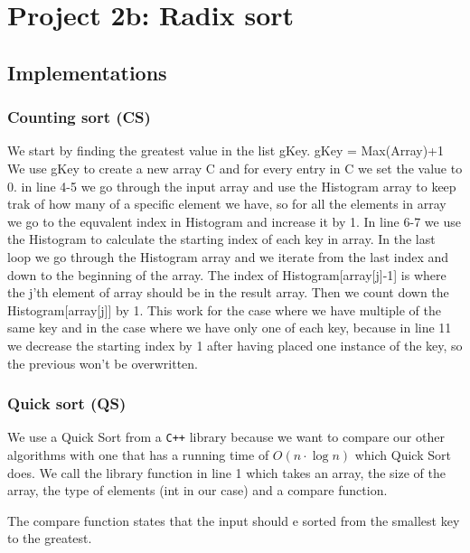 
\chapter{Project 2b: Radix sort} %

\label{Chapter3} %




\section{Implementations}




\subsection{Counting sort (CS)}
We start by finding the greatest value in the list gKey.
gKey = Max(Array)+1
We use gKey to create a new array C and for every entry in C we set the value to 0.
in line 4-5 we go through the input array and use the Histogram array to keep trak of how many of a specific element we have, so for all the elements in array we go to the equvalent index in Histogram and increase it by 1.
In line 6-7 we use the Histogram to calculate the starting index of each key in array.
In the last loop we go through the Histogram array and we iterate from the last index and down to the beginning of the array.
The index of Histogram[array[j]-1] is where the j'th element of array should be in the result array.
Then we count down the Histogram[array[j]] by 1.
This work for the case where we have multiple of the same key and in the case where we have only one of each key, because in line 11 we decrease the starting index by 1 after having placed one instance of the key, so the previous won't be overwritten.


\subsection{Quick sort (QS)}
We use a Quick Sort from a \verb!C++! library because we want to compare our other algorithms with one that has a running time of $ O(n\cdot \log n) $ which Quick Sort does.
We call the library function in line 1 which takes an array, the size of the array, the type of elements (int in our case) and a compare function.

The compare function states that the input should e sorted from the smallest key to the greatest.




